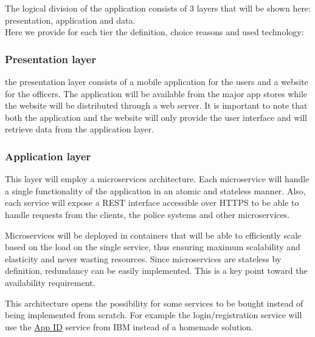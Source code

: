 The logical division of the application consists of 3 layers that will be shown here: presentation, application and data.
\\Here we provide for each tier the definition, choice reasons and used technology:
\subsubsection{Presentation layer}\label{presentationlayer}
the presentation layer consists of a mobile application for the users and a website for the officers.
The application will be available from the major app stores while the website will be distributed through a web server.
It is important to note that both the application and the website will only provide the user interface and will retrieve data from the application layer.

\subsubsection{Application layer}\label{applicationlayer}
This layer will employ a microservices architecture.
Each microservice will handle a single functionality of the application in an atomic and stateless manner.
Also, each service will expose a REST interface accessible over HTTPS to be able to handle requests from the clients, the police systems and other microservices.

Microservices will be deployed in containers that will be able to efficiently scale based on the load on the single service, thus ensuring maximum scalability and elasticity and never wasting resources.
Since microservices are stateless by definition, redundancy can be easily implemented. This is a key point toward the availability requirement.

This architecture opens the possibility for some services to be bought instead of being implemented from scratch. For example the login/registration service will use the \hyperlink{appidsafestreets}{App ID} service from IBM instead of a homemade solution.

